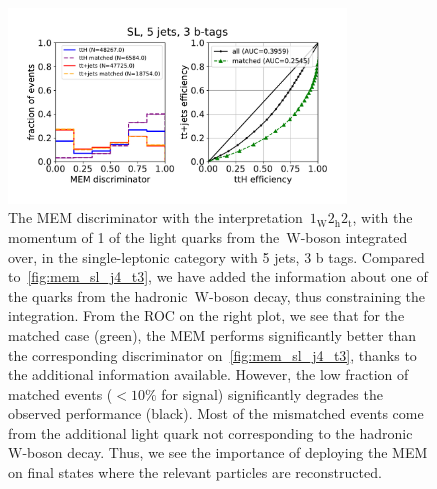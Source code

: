 \begin{figure}[ht]
\begin{centering}
\includegraphics[width = 0.8\textwidth]{figures/mem/mem_sl_j5_t3.pdf}
\caption[MEM with the~$1_{\mathrm{W}} 2_{\mathrm{h}} 2_{\mathrm{t}}$ interpretation in the 5 jet, 3 b~tag category]{The MEM discriminator with the interpretation~$1_{\mathrm{W}} 2_{\mathrm{h}} 2_{\mathrm{t}}$, with the momentum of 1 of the light quarks from the~$\mathrm{W}$-boson integrated over, in the single-leptonic category with 5 jets, 3 b tags. Compared to~\cref{fig:mem_sl_j4_t3}, we have added the information about one of the quarks from the hadronic~$\mathrm{W}$-boson decay, thus constraining the integration. From the ROC on the right plot, we see that for the matched case (green), the MEM performs significantly better than the corresponding discriminator on~\cref{fig:mem_sl_j4_t3}, thanks to the additional information available. However, the low fraction of matched events ($< 10\%$ for signal) significantly degrades the observed performance (black). Most of the mismatched events come from the additional light quark not corresponding to the hadronic~$\mathrm{W}$-boson decay. Thus, we see the importance of deploying the MEM on final states where the relevant particles are reconstructed.}
\label{fig:mem_sl_j5_t3}
\end{centering}
\end{figure}

